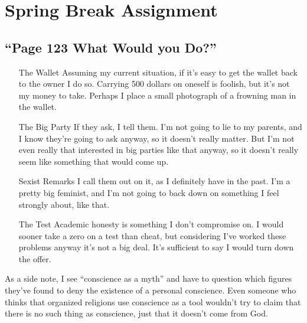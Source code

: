 \documentclass[12pt]{article}
\begin{document}
\section{Spring Break Assignment}
\subsection{``Page 123 What Would you Do?''}
\begin{enumerate}
	\item[The Wallet] Assuming my current situation, if it's easy to get the wallet
		back to the owner I do so.  Carrying 500 dollars on oneself is foolish, but
		it's not my money to take.  Perhaps I place a small photograph of a frowning
		man in the wallet.
	\item[The Big Party] If they ask, I tell them.  I'm not going to lie to my
		parents, and I know they're going to ask anyway, so it doesn't really matter.
		But I'm not even really that interested in big parties like that anyway, so
		it doesn't really seem like something that would come up.
	\item[Sexist Remarks] I call them out on it, as I definitely have in the past.  
		I'm a pretty big feminist, and I'm not going to back down on something I 
		feel strongly about, like that.
	\item[The Test] Academic honesty is something I don't compromise on.  I would
		sooner take a zero on a test than cheat, but considering I've worked these
		problems anyway it's not a big deal.  It's sufficient to say I would turn
		down the offer.
\end{enumerate}

As a side note, I see ``conscience as a myth'' and have to question which 
figures they've found to deny the existence of a personal conscience.  Even
someone who thinks that organized religions use conscience as a tool wouldn't
try to claim that there is no such thing as conscience, just that it doesn't
come from God.
\end{document}

